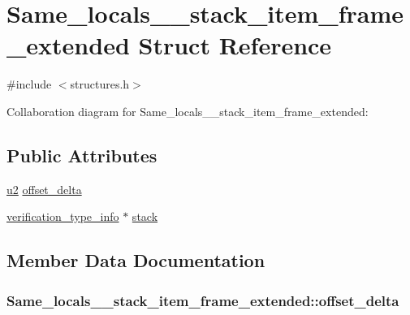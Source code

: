 \hypertarget{structSame__locals__1__stack__item__frame__extended}{}\section{Same\+\_\+locals\+\_\+\_\+stack\+\_\+item\+\_\+frame\+\_\+extended Struct Reference}
\label{structSame__locals__1__stack__item__frame__extended}


{\ttfamily \#include $<$structures.\+h$>$}



Collaboration diagram for Same\+\_\+locals\+\_\+\_\+stack\+\_\+item\+\_\+frame\+\_\+extended\+:
\subsection*{Public Attributes}
\begin{DoxyCompactItemize}
\item 
\hyperlink{structures_8h_a55ef8d87fd202b8417704c089899c5b9}{u2} \hyperlink{structSame__locals__1__stack__item__frame__extended_af1fb0ce3ba68c6d6b49992b99a044235}{offset\+\_\+delta}
\item 
\hyperlink{structverification__type__info}{verification\+\_\+type\+\_\+info} $\ast$ \hyperlink{structSame__locals__1__stack__item__frame__extended_a7900584b7fadb413da796fbd30c1fa2b}{stack}
\end{DoxyCompactItemize}


\subsection{Member Data Documentation}
\subsubsection[{\texorpdfstring{offset\+\_\+delta}{offset_delta}}]{ Same\+\_\+locals\+\_\+\_\+stack\+\_\+item\+\_\+frame\+\_\+extended\+::offset\+\_\+delta}\hypertarget{structSame__locals__1__stack__item__frame__extended_af1fb0ce3ba68c6d6b49992b99a044235}{}\label{structSame__locals__1__stack__item__frame__extended_af1fb0ce3ba68c6d6b49992b99a044235}
